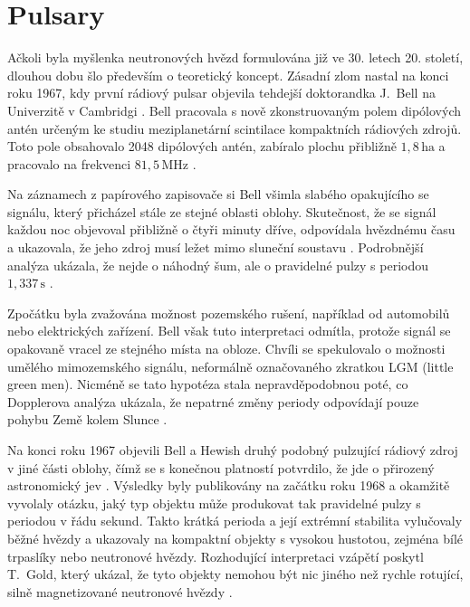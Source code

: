 \documentclass[%
final%
,htext%
]{ipothes}
\begin{document}
\clearpage
\section{Pulsary}

Ačkoli byla myšlenka neutronových hvězd formulována již ve 30. letech 20. století, dlouhou dobu šlo především o teoretický koncept. Zásadní zlom nastal na konci roku 1967, kdy první rádiový pulsar objevila tehdejší doktorandka J.~Bell na Univerzitě v Cambridgi \cite{hewish1968}. Bell pracovala s nově zkonstruovaným polem dipólových antén určeným ke studiu meziplanetární scintilace kompaktních rádiových zdrojů. Toto pole obsahovalo 2048 dipólových antén, zabíralo plochu přibližně $1{,}8\,\mathrm{ha}$ a pracovalo na frekvenci $81{,}5\,\mathrm{MHz}$ \cite{ghosh2007}.

Na záznamech z papírového zapisovače si Bell všimla slabého opakujícího se signálu, který přicházel stále ze stejné oblasti oblohy. Skutečnost, že se signál každou noc objevoval přibližně o čtyři minuty dříve, odpovídala hvězdnému času a ukazovala, že jeho zdroj musí ležet mimo sluneční soustavu \cite{hewish1968}. Podrobnější analýza ukázala, že nejde o náhodný šum, ale o pravidelné pulzy s periodou $1{,}337\,\mathrm{s}$ \cite{hewish1968}.

Zpočátku byla zvažována možnost pozemského rušení, například od automobilů nebo elektrických zařízení. Bell však tuto interpretaci odmítla, protože signál se opakovaně vracel ze stejného místa na obloze. Chvíli se spekulovalo o možnosti umělého mimozemského signálu, neformálně označovaného zkratkou LGM (little green men). Nicméně se tato hypotéza stala nepravděpodobnou poté, co Dopplerova analýza ukázala, že nepatrné změny periody odpovídají pouze pohybu Země kolem Slunce \cite{hewish1968}.

Na konci roku 1967 objevili Bell a Hewish druhý podobný pulzující rádiový zdroj v jiné části oblohy, čímž se s konečnou platností potvrdilo, že jde o přirozený astronomický jev \cite{pilkington1968}. Výsledky byly publikovány na začátku roku 1968 \cite{hewish1968} a okamžitě vyvolaly otázku, jaký typ objektu může produkovat tak pravidelné pulzy s periodou v řádu sekund. Takto krátká perioda a její extrémní stabilita vylučovaly běžné hvězdy a ukazovaly na kompaktní objekty s vysokou hustotou, zejména bílé trpaslíky nebo neutronové hvězdy. Rozhodující interpretaci vzápětí poskytl T.~Gold, který ukázal, že tyto objekty nemohou být nic jiného než rychle rotující, silně magnetizované neutronové hvězdy \cite{gold1968}.
\end{document}
